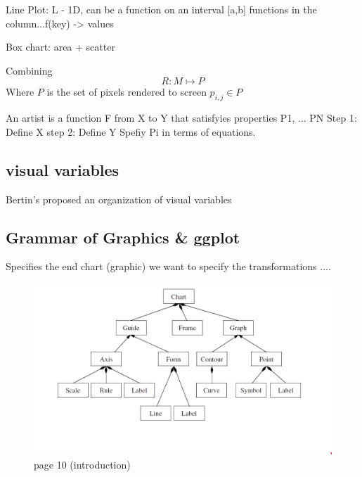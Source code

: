 \documentclass[letterpaper,onecolumn,titlepage]{Ythesis}
\begin{document}
Line Plot:
L - 1D, can be a function on an interval [a,b]
functions in the column...f(key) -> values

Box chart: area + scatter 


Combining 
\begin{equation}
    \label{eg:renderer}
    R: M \mapsto P
\end{equation}
Where $P$ is the set of pixels rendered to screen ${p_{i,j} \in P}$


An artist is a function F from X to Y
that satisfyies properties P1, ... PN
Step 1: Define X
step 2: Define Y
Spefiy Pi in terms of equations.


\subsection{visual variables}
Bertin's proposed an organization of visual variables \cite{bertinIIPropertiesGraphic2011} 


\subsection{Grammar of Graphics \& ggplot}
Specifies the end chart (graphic)
we want to specify the transformations ....
\begin{figure}
    \includegraphics{figures/intro/grammar_chart_composition.png}
    \caption{page 10 (introduction)}
\end{figure}
\end{document}
